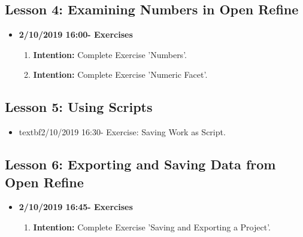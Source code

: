 \documentclass{article}
\begin{document}
\subsection{Lesson 4: Examining Numbers in Open Refine}

\begin{itemize}
\item{\textbf{2/10/2019 16:00- Exercises}}

\begin{enumerate}

\item{\textbf{Intention:} Complete Exercise 'Numbers'.}

\item{\textbf{Intention:} Complete Exercise 'Numeric Facet'.}



\end{enumerate}
\end{itemize}





\subsection{Lesson 5: Using Scripts}

\begin{itemize}
    \item{textbf{2/10/2019 16:30- Exercise: Saving Work as Script.}}
    
\end{itemize}



\subsection{Lesson 6: Exporting and Saving Data from Open Refine}

\begin{itemize}
\item{\textbf{2/10/2019 16:45- Exercises}}

\begin{enumerate}

\item{\textbf{Intention:} Complete Exercise 'Saving and Exporting a Project'.}


\end{enumerate}
\end{itemize}
\end{document}
